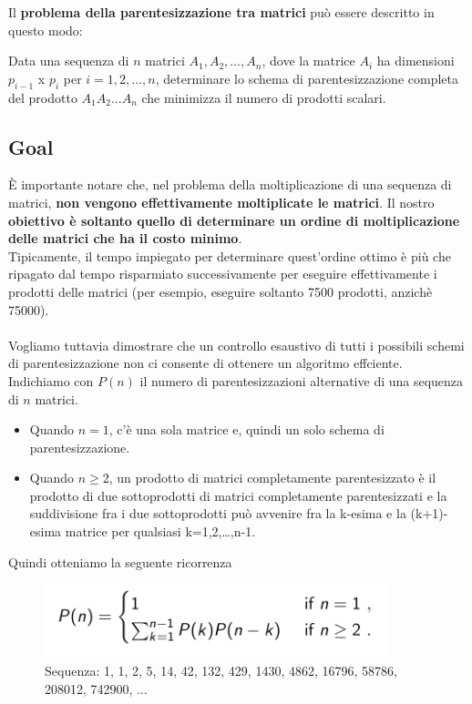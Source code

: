 Il \textbf{problema della parentesizzazione tra matrici} può essere
descritto in questo modo:
\begin{myblockquote}
  Data una sequenza di $n$
  matrici $A_1, A_2, \ldots, A_n$, dove la matrice $A_i$ ha dimensioni
  $p_{i-1}$ x $p_i$ per $i = 1,2, \ldots,n$, determinare lo schema di
  parentesizzazione completa del prodotto $A_1A_2 \ldots A_n$ che minimizza
  il numero di prodotti scalari.
\end{myblockquote}


\subsection{Goal}

È importante notare che, nel problema della moltiplicazione di una
sequenza di matrici, \textbf{non vengono effettivamente moltiplicate le
  matrici}. Il nostro \textbf{obiettivo è soltanto quello di determinare
  un ordine di moltiplicazione delle matrici che ha il costo minimo}.\\
Tipicamente, il tempo impiegato per determinare quest'ordine ottimo è
più che ripagato dal tempo risparmiato successivamente per eseguire
effettivamente i prodotti delle matrici (per esempio, eseguire soltanto
7500 prodotti, anzichè 75000).\\
\\
Vogliamo tuttavia dimostrare che un controllo esaustivo di tutti i
possibili schemi di parentesizzazione non ci consente di ottenere un
algoritmo effciente. Indichiamo con $P(n)$ il numero di
parentesizzazioni alternative di una sequenza di $n$ matrici.
\begin{itemize}
  \item Quando
        $n=1$, c'è una sola matrice e, quindi un solo schema di
        parentesizzazione.
  \item Quando $n \ge 2$, un prodotto di matrici
        completamente parentesizzato è il prodotto di due sottoprodotti di
        matrici completamente parentesizzati e la suddivisione fra i due
        sottoprodotti può avvenire fra la k-esima e la (k+1)-esima matrice per
        qualsiasi k=1,2,\ldots,n-1.
\end{itemize}

Quindi otteniamo la seguente ricorrenza

\begin{figure}[H]
  \centering
  \includegraphics[width=10cm, keepaspectratio]{capitoli/programmazione_dinamica/imgs/matrix1.png}
  \caption{Sequenza: 1, 1, 2, 5, 14, 42, 132, 429, 1430, 4862, 16796, 58786, 208012, 742900,
    $\ldots$}
\end{figure}

